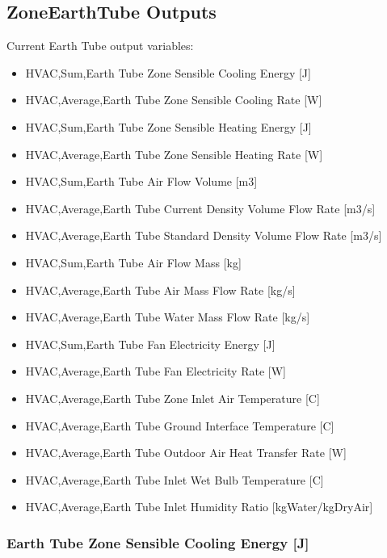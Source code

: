 \subsection{ZoneEarthTube Outputs}\label{zoneearthtube-outputs}

Current Earth Tube output variables:

\begin{itemize}
\item
  HVAC,Sum,Earth Tube Zone Sensible Cooling Energy {[}J{]}
\item
  HVAC,Average,Earth Tube Zone Sensible Cooling Rate {[}W{]}
\item
  HVAC,Sum,Earth Tube Zone Sensible Heating Energy {[}J{]}
\item
  HVAC,Average,Earth Tube Zone Sensible Heating Rate {[}W{]}
\item
  HVAC,Sum,Earth Tube Air Flow Volume {[}m3{]}
\item
  HVAC,Average,Earth Tube Current Density Volume Flow Rate {[}m3/s{]}
\item
  HVAC,Average,Earth Tube Standard Density Volume Flow Rate {[}m3/s{]}
\item
  HVAC,Sum,Earth Tube Air Flow Mass {[}kg{]}
\item
  HVAC,Average,Earth Tube Air Mass Flow Rate {[}kg/s{]}
\item
  HVAC,Average,Earth Tube Water Mass Flow Rate {[}kg/s{]}
\item
  HVAC,Sum,Earth Tube Fan Electricity Energy {[}J{]}
\item
  HVAC,Average,Earth Tube Fan Electricity Rate {[}W{]}
\item
  HVAC,Average,Earth Tube Zone Inlet Air Temperature {[}C{]}
\item
  HVAC,Average,Earth Tube Ground Interface Temperature {[}C{]}
\item
  HVAC,Average,Earth Tube Outdoor Air Heat Transfer Rate {[}W{]}
\item
  HVAC,Average,Earth Tube Inlet Wet Bulb Temperature {[}C{]}
\item
  HVAC,Average,Earth Tube Inlet Humidity Ratio {[}kgWater/kgDryAir{]}
\end{itemize}

\subsubsection{Earth Tube Zone Sensible Cooling Energy {[}J{]}}\label{earth-tube-zone-sensible-cooling-energy-j}

